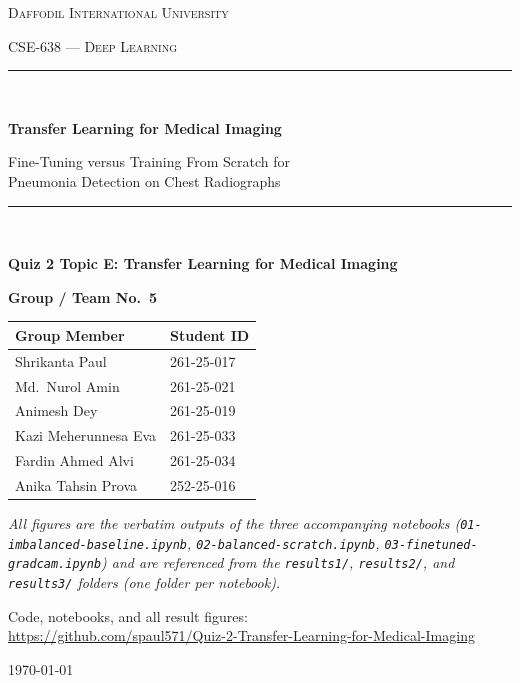\documentclass[11pt,a4paper]{article}
\numberwithin{figure}{section}
\numberwithin{table}{section}
\begin{document}
\begin{titlepage}
\centering
\vspace*{1.5cm}

{\scshape\large Daffodil International University\par}
\vspace{0.4cm}
{\scshape CSE-638 --- Deep Learning\par}
\vspace{2.0cm}

\rule{\linewidth}{0.4mm}\\[0.5cm]
{\huge\bfseries Transfer Learning for Medical Imaging\par}
\vspace{0.6cm}
{\Large Fine-Tuning versus Training From Scratch for\\[0.2cm]
Pneumonia Detection on Chest Radiographs\par}
\rule{\linewidth}{0.4mm}\\[1.5cm]

{\large\textbf{Quiz 2   Topic E: Transfer Learning for Medical Imaging}\par}
\vspace{0.3cm}
{\large\textbf{Group / Team No.\ 5}\par}

\vspace{1.5cm}

{\large
\begin{tabular}{ll}
\toprule
\textbf{Group Member} & \textbf{Student ID} \\
\midrule
Shrikanta Paul & 261-25-017 \\
Md.\ Nurol Amin & 261-25-021 \\
Animesh Dey & 261-25-019 \\
Kazi Meherunnesa Eva & 261-25-033 \\
Fardin Ahmed Alvi & 261-25-034 \\
Anika Tahsin Prova & 252-25-016 \\
\bottomrule
\end{tabular}\par}

\vfill

{\small\textit{All figures are the verbatim outputs of the three accompanying notebooks
(\texttt{01-imbalanced-baseline.ipynb}, \texttt{02-balanced-scratch.ipynb},
\texttt{03-finetuned-gradcam.ipynb}) and are referenced from the \texttt{results1/},
\texttt{results2/}, and \texttt{results3/} folders (one folder per notebook).}\par}

\vspace{0.6cm}

{\small Code, notebooks, and all result figures:\\
\url{https://github.com/spaul571/Quiz-2-Transfer-Learning-for-Medical-Imaging}\par}

\vspace{1.0cm}
{\large \today\par}
\end{titlepage}
\end{document}
